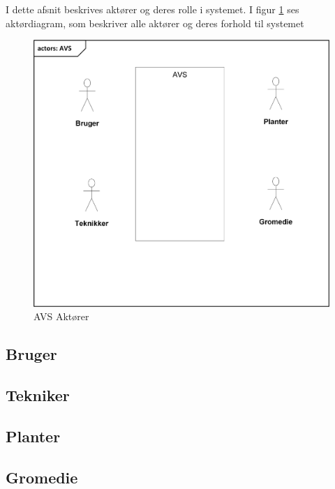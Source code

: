 I dette afsnit beskrives aktører og deres rolle i systemet. I figur \ref{photo:Aktor} ses aktørdiagram, som beskriver alle aktører og deres forhold til systemet

\begin{figure}[H]
	\centering
	\includegraphics[scale=1]{Kravspecifikation/Actor/Photo/AVS_Actors}
	\caption{AVS Aktører}
	\label{photo:Aktor}
\end{figure}

\subsection{Bruger}

\subsection{Tekniker}

\subsection{Planter}

\subsection{Gromedie}
